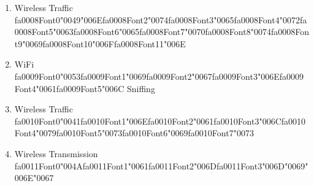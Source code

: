 \documentclass[12pt]{article}
\begin{document}
\begin{enumerate}[label=\arabic*.]
\begin{enumerate}[label=(\alph*)]
    \item Wireless Traffic {\csname fa0008Font0\endcsname\char"0049}{\char"006E}{\csname fa0008Font2\endcsname\char"0074}{\csname fa0008Font3\endcsname\char"0065}{\csname fa0008Font4\endcsname\char"0072}{\csname fa0008Font5\endcsname\char"0063}{\csname fa0008Font6\endcsname\char"0065}{\csname fa0008Font7\endcsname\char"0070}{\csname fa0008Font8\endcsname\char"0074}{\csname fa0008Font9\endcsname\char"0069}{\csname fa0008Font10\endcsname\char"006F}{\csname fa0008Font11\endcsname\char"006E}
    \item WiFi {\csname fa0009Font0\endcsname\char"0053}{\csname fa0009Font1\endcsname\char"0069}{\csname fa0009Font2\endcsname\char"0067}{\csname fa0009Font3\endcsname\char"006E}{\csname fa0009Font4\endcsname\char"0061}{\csname fa0009Font5\endcsname\char"006C} Sniffing
    \item Wireless Traffic {\csname fa0010Font0\endcsname\char"0041}{\csname fa0010Font1\endcsname\char"006E}{\csname fa0010Font2\endcsname\char"0061}{\csname fa0010Font3\endcsname\char"006C}{\csname fa0010Font4\endcsname\char"0079}{\csname fa0010Font5\endcsname\char"0073}{\csname fa0010Font6\endcsname\char"0069}{\csname fa0010Font7\endcsname\char"0073}
    \item Wireless Transmission {\csname fa0011Font0\endcsname\char"004A}{\csname fa0011Font1\endcsname\char"0061}{\csname fa0011Font2\endcsname\char"006D}{\csname fa0011Font3\endcsname\char"006D}{\char"0069}{\char"006E}{\char"0067}
\end{enumerate}
\end{enumerate}
\end{document}
